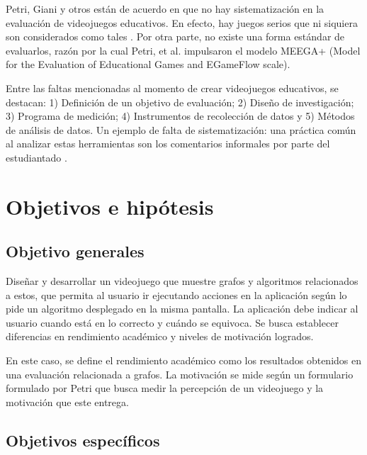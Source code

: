 \documentclass[submission]{eptcs}
\begin{document}
Petri, Giani y otros \cite{petri2018method} están de acuerdo en que no hay sistematización en la evaluación de
videojuegos educativos. En efecto, hay juegos serios que ni siquiera son considerados como tales
\cite{evaluation_of_games_for_teaching_cs}. Por otra parte, no existe una forma estándar de evaluarlos, razón por
la cual Petri, et al. \cite{petri2018method} impulsaron el modelo MEEGA+ (Model for the Evaluation of Educational
Games and EGameFlow scale).

Entre las faltas mencionadas al momento de crear videojuegos educativos, se destacan: 1) Definición de un objetivo
de evaluación; 2) Diseño de investigación; 3) Programa de medición; 4) Instrumentos de recolección de datos y 5) Métodos
de análisis de datos. Un ejemplo de falta de sistematización: una práctica común al analizar estas herramientas son los 
comentarios informales por parte del estudiantado \cite{petri2018method}.


\section{Objetivos e hipótesis}

\subsection{Objetivo generales}



Diseñar y desarrollar un videojuego que muestre grafos y algoritmos relacionados a estos,
que permita al usuario ir ejecutando acciones en la aplicación según lo pide un algoritmo
desplegado en la misma pantalla. La aplicación debe indicar al usuario cuando está en lo
correcto y cuándo se equivoca.
Se busca establecer diferencias en rendimiento académico y niveles de motivación logrados.

En este caso, se define el rendimiento académico como los resultados obtenidos en una evaluación relacionada a grafos.
La motivación se mide según un formulario formulado por Petri \cite{petri2018meegaplus} que busca medir la percepción de un
videojuego y la motivación que este entrega.


\subsection{Objetivos específicos}
\end{document}
